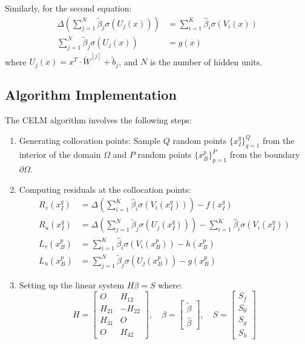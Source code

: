 \documentclass[11pt]{article}
\begin{document}
Similarly, for the second equation:
\begin{align}
\Delta \left( \sum_{j=1}^{N} \tilde{\beta}_j \sigma(U_j(x)) \right) &= \sum_{i=1}^{K} \hat{\beta}_i \sigma(V_i(x)) \\
\sum_{j=1}^{N} \tilde{\beta}_j \sigma(U_j(x)) &= g(x)
\end{align}
where $U_j(x) = x^T \cdot \tilde{W}^{[j]} + \tilde{b}_j$, and $N$ is the number of hidden units.

\subsection{Algorithm Implementation}

The CELM algorithm involves the following steps:

\begin{enumerate}
    \item Generating collocation points: Sample $Q$ random points $\{x_I^q\}_{q=1}^Q$ from the interior of the domain $\Omega$ and $P$ random points $\{x_B^p\}_{p=1}^P$ from the boundary $\partial\Omega$.
    
    \item Computing residuals at the collocation points:
    \begin{align}
    R_v(x_I^q) &= \Delta \left( \sum_{i=1}^{K} \hat{\beta}_i \sigma(V_i(x_I^q)) \right) - f(x_I^q) \\
    R_u(x_I^q) &= \Delta \left( \sum_{j=1}^{N} \tilde{\beta}_j \sigma(U_j(x_I^q)) \right) - \sum_{i=1}^{K} \hat{\beta}_i \sigma(V_i(x_I^q)) \\
    L_v(x_B^p) &= \sum_{i=1}^{K} \hat{\beta}_i \sigma(V_i(x_B^p)) - h(x_B^p) \\
    L_u(x_B^p) &= \sum_{j=1}^{N} \tilde{\beta}_j \sigma(U_j(x_B^p)) - g(x_B^p)
    \end{align}
    
    \item Setting up the linear system $H\beta = S$ where:
    \begin{equation}
    H = 
    \begin{bmatrix}
    O & H_{12} \\
    H_{21} & -H_{22} \\
    H_{31} & O \\
    O & H_{42}
    \end{bmatrix},
    \quad
    \beta = 
    \begin{bmatrix}
    \tilde{\beta} \\
    \hat{\beta}
    \end{bmatrix},
    \quad
    S = 
    \begin{bmatrix}
    S_f \\
    S_0 \\
    S_g \\
    S_h
    \end{bmatrix}
    \end{equation}
    

\end{enumerate}
\end{document}
